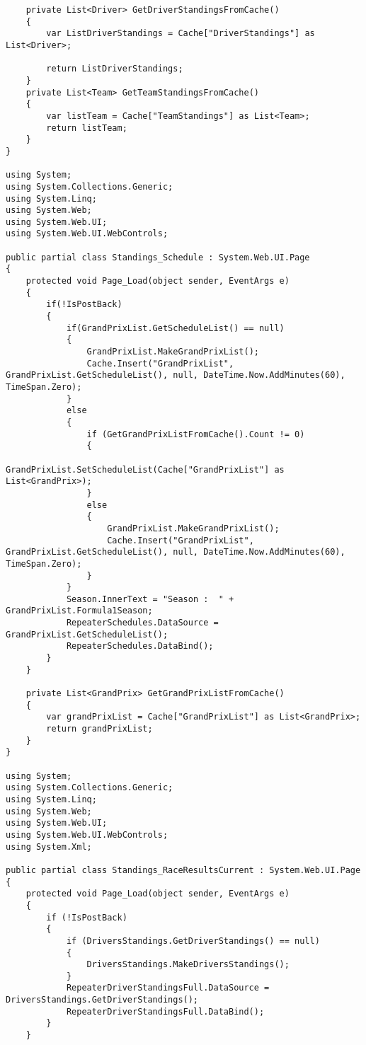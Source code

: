 \documentclass[14pt,a4paper]{extreport}
\begin{document}
\begin{landscape}
\begin{lstlisting}
    private List<Driver> GetDriverStandingsFromCache()
    {
        var ListDriverStandings = Cache["DriverStandings"] as List<Driver>;

        return ListDriverStandings;
    }
    private List<Team> GetTeamStandingsFromCache()
    {
        var listTeam = Cache["TeamStandings"] as List<Team>;
        return listTeam;
    }
}

using System;
using System.Collections.Generic;
using System.Linq;
using System.Web;
using System.Web.UI;
using System.Web.UI.WebControls;

public partial class Standings_Schedule : System.Web.UI.Page
{
    protected void Page_Load(object sender, EventArgs e)
    {
        if(!IsPostBack)
        {
            if(GrandPrixList.GetScheduleList() == null)
            {
                GrandPrixList.MakeGrandPrixList();
                Cache.Insert("GrandPrixList", GrandPrixList.GetScheduleList(), null, DateTime.Now.AddMinutes(60), TimeSpan.Zero);
            }
            else
            {
                if (GetGrandPrixListFromCache().Count != 0)
                {
                    GrandPrixList.SetScheduleList(Cache["GrandPrixList"] as List<GrandPrix>);
                }
                else
                {
                    GrandPrixList.MakeGrandPrixList();
                    Cache.Insert("GrandPrixList", GrandPrixList.GetScheduleList(), null, DateTime.Now.AddMinutes(60), TimeSpan.Zero);
                }
            }
            Season.InnerText = "Season :  " + GrandPrixList.Formula1Season;
            RepeaterSchedules.DataSource = GrandPrixList.GetScheduleList();
            RepeaterSchedules.DataBind();
        }
    }

    private List<GrandPrix> GetGrandPrixListFromCache()
    {
        var grandPrixList = Cache["GrandPrixList"] as List<GrandPrix>;
        return grandPrixList;
    }
}

using System;
using System.Collections.Generic;
using System.Linq;
using System.Web;
using System.Web.UI;
using System.Web.UI.WebControls;
using System.Xml;

public partial class Standings_RaceResultsCurrent : System.Web.UI.Page
{
    protected void Page_Load(object sender, EventArgs e)
    {
        if (!IsPostBack)
        {
            if (DriversStandings.GetDriverStandings() == null)
            {
                DriversStandings.MakeDriversStandings();
            }
            RepeaterDriverStandingsFull.DataSource = DriversStandings.GetDriverStandings();
            RepeaterDriverStandingsFull.DataBind();
        }
    }



\end{lstlisting}
\end{landscape}
\end{document}
